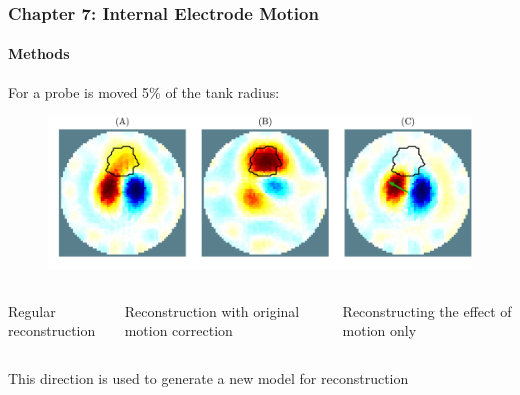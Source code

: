 \documentclass[10pt,    %
    english,            %
    xcolor=table,       %
    envcountsect,        %
    aspectratio=1610
]{beamer}
\begin{document}
\begin{frame}
	\frametitle{Chapter 7: Internal Electrode Motion}
	\framesubtitle{Methods}
	For a probe is moved 5\% of the tank radius: \\ \vspace{2mm}
	\begin{figure}[H]
		\centering
		\includegraphics[width=\textwidth,trim={0cm 0.6cm 0 1.4cm},clip]{recon_methods.pdf}
	\end{figure}
	\begin{columns}[c]
		\begin{column}{0.33\textwidth}
			\centering
			{\large Regular reconstruction} 
		\end{column}
		\begin{column}{0.33\textwidth}
			\centering
			{\large Reconstruction with original motion correction} 
		\end{column}
		\begin{column}{0.33\textwidth}
			\centering
			{\large Reconstructing the effect of motion only}
		\end{column}
		\end{columns}
		\vspace{5mm}
		\centering
		\alert{This direction is used to generate a new model for reconstruction}
\end{frame}
\end{document}
